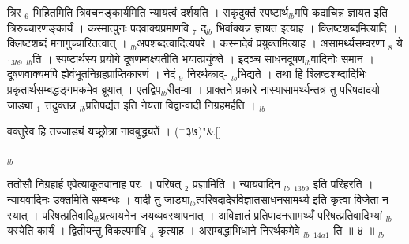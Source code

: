 \documentclass[article,12pt,a4paper]{memoir}%
\newcommand{\add}[1]{($^{+}$#1)}
\newcounter{parCount}
\begin{document}
	  
	  \pstart \leavevmode%
	त्रिर {\tiny $_{6}$} भिहितमिति त्रिवचनङ्कार्यमिति न्यायत्वं दर्शयति । सकृदुक्तं स्पष्टार्थ{\tiny $_{lb}$}मपि कदाचिन्न ज्ञायत इति त्रिरुच्चारणङ्कार्यं । कस्मात्पुनः पदवाक्यप्रमाणवि {\tiny $_{7}$} द्{\tiny $_{lb}$}\leavevmode{} भिर्वाक्यन्न ज्ञायत इत्याह । {\color{DodgerBlue3}क्लिष्टशब्दमित्यादि} । क्लिष्टशब्दं मनागुच्चारितत्वात् । {\tiny $_{lb}$}अपशब्दत्वादित्यपरे । कस्मादेवं प्रयुक्तमित्याह । {\color{DodgerBlue3}असामर्थ्यसम्वरणा {\tiny $_{8}$} ये {\tiny $_{13b9}$} {\tiny $_{lb}$}ति} । स्पष्टार्थस्य प्रयोगे दूषणम्वक्ष्यतीति भयात्प्रयुंक्ते । इदञ्च साधनदूषण{\tiny $_{lb}$}वादिनोः समानं । दूषणवाक्यमपि ह्येवंभूतनिग्रहप्राप्तिकारणं । नेदं {\tiny $_{9}$} \leavevmode{} निरर्थकाद्- {\tiny $_{lb}$}भिद्यते । तथा हि श्लिष्टशब्दादिभिः प्रकृतार्थसम्बद्धङ्गमकमेव ब्रूयात् । एतद्विप{\tiny $_{lb}$}रीतम्वा । प्राक्तने प्रकारे नास्यासामर्थ्यन्तत्र तु परिषदादयो जाड्या {\tiny $_{1}$} त्तदुक्तन्न {\tiny $_{lb}$}प्रतिपद्यंत इति नेयता विद्वान्वादी निग्रहमर्हति ।
	{}
	\pend%
      {\tiny $_{lb}$}
	  \bigskip
	  \begingroup
	
	    
	    \stanza[\smallbreak]
	  वक्तुरेव हि तज्जाड्यं यच्छ्रोत्रा नावबुद्ध्यतें । \add{३७}{\normalfontlatin\large\qquad{}"}\&[\smallbreak]
	  
	  
	  
	  \endgroup
	{\tiny $_{lb}$}

	  
	  \pstart \leavevmode%
	ततोसौ निग्रहार्ह एवेत्याकूतवानाह परः । परिषत् {\tiny $_{2}$} प्रज्ञामिति । {\color{DodgerBlue3}न्यायवादिन} {\tiny $_{lb}$} {\tiny $_{13b9}$} इति परिहरति । न्यायवादिनः उक्तमिति सम्बन्धः । वादी तु जाड्या{\tiny $_{lb}$}त्परिषदादेरविज्ञातसाधनसामर्थ्य इति कृत्वा विजेता न स्यात् । परिषत्प्रतिवादि{\tiny $_{lb}$}प्रत्यायनेन जयव्यवस्थापनात् । अविज्ञातं प्रतिपादनसामर्थ्यं परिषत्प्रतिवादिभ्यां {\tiny $_{lb}$}यस्येति कार्यं । द्वितीयन्तु विकल्पमधि {\tiny $_{4}$} कृत्याह । {\color{DodgerBlue3}असम्बद्धाभिधाने निरर्थकमेवे} {\tiny $_{lb}$} {\tiny $_{14a1}$} {\color{DodgerBlue3}ति} ॥ ४ ॥
	{}
	\pend%
      {\tiny $_{lb}$}
\end{document}
